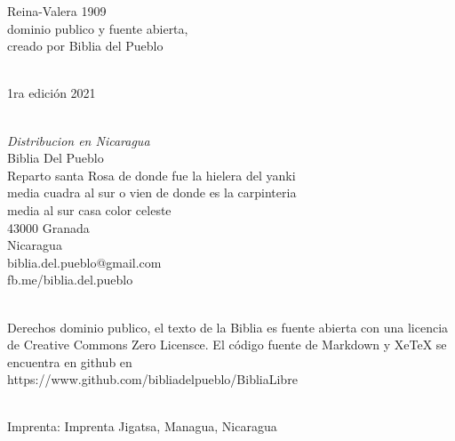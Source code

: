 \hfill\break
Reina-Valera 1909\\
dominio publico y fuente abierta,\\
creado por Biblia del Pueblo\\
\strut \\
1ra edición 2021\\
\strut \\
\emph{Distribucion en Nicaragua}\\
Biblia Del Pueblo\\
Reparto santa Rosa de donde fue la hielera del yanki\\
media cuadra al sur o vien de donde es la carpinteria\\
media al sur casa color celeste\\
43000 Granada\\
Nicaragua\\
biblia.del.pueblo@gmail.com\\
fb.me/biblia.del.pueblo\\
\strut \\
Derechos dominio publico, el texto de la Biblia es fuente abierta con
una licencia de Creative Commons Zero Licensce. El código fuente de
Markdown y XeTeX se encuentra en github en\\
https://www.github.com/bibliadelpueblo/BibliaLibre\\
\strut \\
Imprenta: Imprenta Jigatsa, Managua, Nicaragua\\
